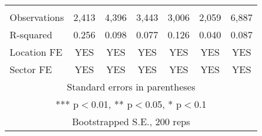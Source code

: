 \documentclass[]{article}
\begin{document}
\begin{tabular}{lcccccc}
 &  &  &  &  &  &  \\
Observations & 2,413 & 4,396 & 3,443 & 3,006 & 2,059 & 6,887 \\
R-squared & 0.256 & 0.098 & 0.077 & 0.126 & 0.040 & 0.087 \\
Location FE & YES & YES & YES & YES & YES & YES \\
 Sector FE & YES & YES & YES & YES & YES & YES \\ \hline
\multicolumn{7}{c}{ Standard errors in parentheses} \\
\multicolumn{7}{c}{ *** p$<$0.01, ** p$<$0.05, * p$<$0.1} \\
\multicolumn{7}{c}{ Bootstrapped S.E., 200 reps} \\
\end{tabular}
\end{document}
